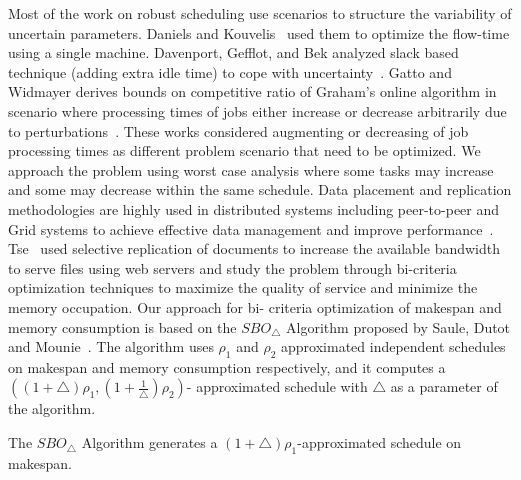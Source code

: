  Most of the work on robust scheduling use scenarios to structure
 the variability of uncertain parameters. Daniels and
 Kouvelis~\cite{citeulike:8334169} used them to optimize the flow-time
 using a single machine. Davenport, Gefflot, and Bek analyzed slack
 based technique (adding extra idle time) to cope with
 uncertainty~\cite{Davenport_slack-basedtechniques}. Gatto and Widmayer
 derives bounds on competitive ratio of Graham’s online algorithm in
 scenario where processing times of jobs either increase or decrease
 arbitrarily due to perturbations~\cite{Gatto07}.  These works
 considered augmenting or decreasing of job processing times as
 different problem scenario that need to be optimized. We 
 approach the problem using worst case analysis where some tasks may
 increase and some may decrease within the same schedule.
 Data placement and replication methodologies are highly used in
 distributed systems including peer-to-peer and Grid systems to achieve
 effective data management and improve
 performance~\cite{Cirne2007213}\cite{Abawajy}\cite{4215379}. Tse~\cite{DBLP:journals/tc/Tse12}
 used selective replication of documents to increase the available
 bandwidth to serve files using web servers and study the problem
 through bi-criteria optimization techniques to maximize the quality of
 service and minimize the memory occupation. Our approach for bi- criteria optimization of makespan and memory consumption is based on the $ SBO_{\triangle}$ Algorithm proposed by Saule, Dutot and Mounie~\cite{10.1109/IPDPS.2008.4536292}. The algorithm uses  $\rho_1$ and $\rho_2$ approximated independent schedules on makespan and memory consumption respectively, and it computes a $((1+\triangle)\rho_1 , (1+\frac{1}{\triangle})\rho_2 )$- approximated schedule with $\triangle$ as a parameter of the algorithm.
 \begin{property}\citet{10.1109/IPDPS.2008.4536292}
 The $SBO_\triangle$ Algorithm generates a $ (1+\triangle)  \rho_1$-approximated schedule on makespan.
 \end{property}         
